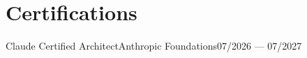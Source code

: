 \section{Certifications}
\resumeSubHeadingListStart
\resumeSubheading
{Claude Certified Architect}{Anthropic}
{Foundations}{07/2026 --- 07/2027}
\resumeSubHeadingListEnd
